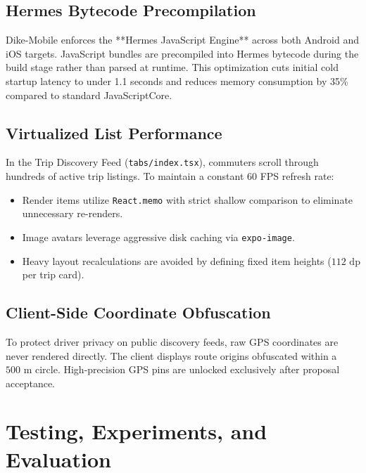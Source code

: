 \documentclass[conference,10pt,a4paper]{IEEEtran}
\begin{document}
\subsection{Hermes Bytecode Precompilation}
Dike-Mobile enforces the **Hermes JavaScript Engine** across both Android and iOS targets. JavaScript bundles are precompiled into Hermes bytecode during the build stage rather than parsed at runtime. This optimization cuts initial cold startup latency to under 1.1 seconds and reduces memory consumption by 35\% compared to standard JavaScriptCore.

\subsection{Virtualized List Performance}
In the Trip Discovery Feed (\texttt{tabs/index.tsx}), commuters scroll through hundreds of active trip listings. To maintain a constant 60 FPS refresh rate:
\begin{itemize}
    \item Render items utilize \texttt{React.memo} with strict shallow comparison to eliminate unnecessary re-renders.
    \item Image avatars leverage aggressive disk caching via \texttt{expo-image}.
    \item Heavy layout recalculations are avoided by defining fixed item heights ($112\text{ dp}$ per trip card).
\end{itemize}

\subsection{Client-Side Coordinate Obfuscation}
To protect driver privacy on public discovery feeds, raw GPS coordinates are never rendered directly. The client displays route origins obfuscated within a $500\text{ m}$ circle. High-precision GPS pins are unlocked exclusively after proposal acceptance.

\section{Testing, Experiments, and Evaluation}
\end{document}
